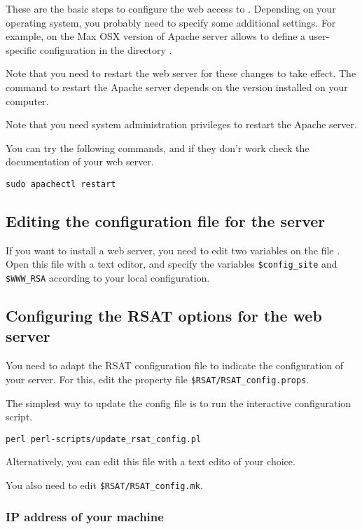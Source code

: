 \documentclass[12pt,a4paper, twoside]{scrreprt} %
\begin{document}
These are the basic steps to configure the web access to
\RSAT. Depending on your operating system, you probably need to
specify some additional settings. For example, on the Max OSX version
of Apache server allows to define a user-specific configuration in the
directory .

Note that you need to restart the web server for these changes to take
effect. The command to restart the Apache server depends on the
version installed on your computer. 

Note that you need system administration privileges to restart the
Apache server.

You can try the following commands, and if they don'r work check the
documentation of your web server.

\begin{lstlisting}
sudo apachectl restart
\end{lstlisting}

\subsection{Editing the configuration file for the \RSAT server}

If you want to install a web server, you need to edit two variables on
the file . Open this file with a text editor, and
specify the variables \texttt{\$config\_site} and \texttt{\$WWW\_RSA}
according to your local configuration.

\subsection{Configuring the RSAT options for the web server}

You need to adapt the RSAT configuration file to indicate the
configuration of your server. For this, edit the \RSAT property file
\texttt{\$RSAT/RSAT\_config.props}.

The simplest way to update the config file is to run the interactive
configuration script.

\begin{lstlisting}
perl perl-scripts/update_rsat_config.pl
\end{lstlisting}

Alternatively, you can edit this file with a text edito of your
choice.

You also need to edit \texttt{\$RSAT/RSAT\_config.mk}. 

\subsubsection{IP address of your machine}
\end{document}
